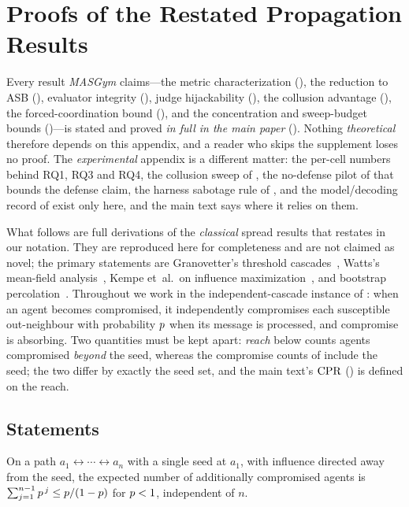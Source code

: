 \section{Proofs of the Restated Propagation Results}
\label{app:proofs}

\noindent Every result \emph{MASGym} claims---the metric characterization
(), the reduction to ASB (), evaluator integrity
(), judge hijackability (), the collusion
advantage (), the forced-coordination bound (), and
the concentration and sweep-budget bounds ()---is stated and
proved \emph{in full in the main paper} (). Nothing
\emph{theoretical} therefore depends on this appendix, and a reader who skips the
supplement loses no proof. The \emph{experimental} appendix is a different matter: the
per-cell numbers behind RQ1, RQ3 and RQ4, the collusion sweep of , the
no-defense pilot of  that bounds the defense claim, the harness
sabotage rule of , and the model/decoding record of 
exist only here, and the main text says where it relies on them.

What follows are full derivations of the \emph{classical} spread results that
 restates in our notation. They are reproduced here for
completeness and are not claimed as novel; the primary statements are Granovetter's
threshold cascades~\cite{granovetter1978threshold}, Watts's mean-field
analysis~\cite{watts2002simple}, Kempe et~al.\ on influence
maximization~\cite{kempe2003maximizing}, and bootstrap
percolation~\cite{chalupa1979bootstrap}. Throughout we work in the independent-cascade
instance of : when an agent becomes compromised, it independently
compromises each susceptible out-neighbour with probability $p$ when its message is
processed, and compromise is absorbing. Two quantities must be kept apart: \emph{reach}
below counts agents compromised \emph{beyond} the seed, whereas the compromise counts of
 include the seed; the two differ by exactly the seed set, and the
main text's $\mathrm{CPR}$ () is defined on the reach.

\subsection{Statements}

\begin{proposition}\label{prop:chain}
On a path $a_1\leftrightarrow\cdots\leftrightarrow a_n$ with a single seed at $a_1$, with
influence directed away from the seed, the expected number
of additionally compromised agents is $\sum_{j=1}^{n-1}p^{\,j}\le p/(1-p)$ for
$p<1$, independent of $n$.
\end{proposition}

